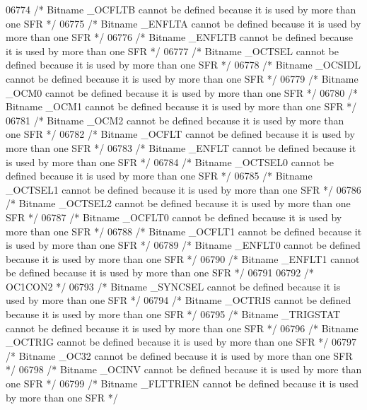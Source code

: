 \begin{DoxyCode}
06774 \textcolor{comment}{/* Bitname \_OCFLTB cannot be defined because it is used by more than one SFR */}
06775 \textcolor{comment}{/* Bitname \_ENFLTA cannot be defined because it is used by more than one SFR */}
06776 \textcolor{comment}{/* Bitname \_ENFLTB cannot be defined because it is used by more than one SFR */}
06777 \textcolor{comment}{/* Bitname \_OCTSEL cannot be defined because it is used by more than one SFR */}
06778 \textcolor{comment}{/* Bitname \_OCSIDL cannot be defined because it is used by more than one SFR */}
06779 \textcolor{comment}{/* Bitname \_OCM0 cannot be defined because it is used by more than one SFR */}
06780 \textcolor{comment}{/* Bitname \_OCM1 cannot be defined because it is used by more than one SFR */}
06781 \textcolor{comment}{/* Bitname \_OCM2 cannot be defined because it is used by more than one SFR */}
06782 \textcolor{comment}{/* Bitname \_OCFLT cannot be defined because it is used by more than one SFR */}
06783 \textcolor{comment}{/* Bitname \_ENFLT cannot be defined because it is used by more than one SFR */}
06784 \textcolor{comment}{/* Bitname \_OCTSEL0 cannot be defined because it is used by more than one SFR */}
06785 \textcolor{comment}{/* Bitname \_OCTSEL1 cannot be defined because it is used by more than one SFR */}
06786 \textcolor{comment}{/* Bitname \_OCTSEL2 cannot be defined because it is used by more than one SFR */}
06787 \textcolor{comment}{/* Bitname \_OCFLT0 cannot be defined because it is used by more than one SFR */}
06788 \textcolor{comment}{/* Bitname \_OCFLT1 cannot be defined because it is used by more than one SFR */}
06789 \textcolor{comment}{/* Bitname \_ENFLT0 cannot be defined because it is used by more than one SFR */}
06790 \textcolor{comment}{/* Bitname \_ENFLT1 cannot be defined because it is used by more than one SFR */}
06791 
06792 \textcolor{comment}{/* OC1CON2 */}
06793 \textcolor{comment}{/* Bitname \_SYNCSEL cannot be defined because it is used by more than one SFR */}
06794 \textcolor{comment}{/* Bitname \_OCTRIS cannot be defined because it is used by more than one SFR */}
06795 \textcolor{comment}{/* Bitname \_TRIGSTAT cannot be defined because it is used by more than one SFR */}
06796 \textcolor{comment}{/* Bitname \_OCTRIG cannot be defined because it is used by more than one SFR */}
06797 \textcolor{comment}{/* Bitname \_OC32 cannot be defined because it is used by more than one SFR */}
06798 \textcolor{comment}{/* Bitname \_OCINV cannot be defined because it is used by more than one SFR */}
06799 \textcolor{comment}{/* Bitname \_FLTTRIEN cannot be defined because it is used by more than one SFR */}

\end{DoxyCode}
